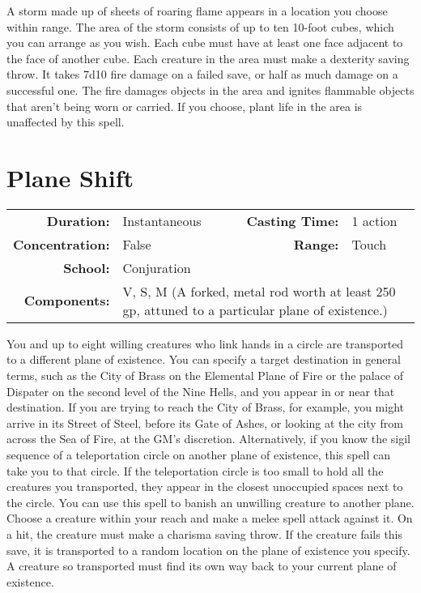 \documentclass[a5paper, 12pt]{memoir}
\begin{document}
\vspace{1\baselineskip}\noindent A storm made up of sheets of roaring flame appears in a location you choose within range. The area of the storm consists of up to ten 10-foot cubes, which you can arrange as you wish. Each cube must have at least one face adjacent to the face of another cube. Each creature in the area must make a dexterity saving throw. It takes 7d10 fire damage on a failed save, or half as much damage on a successful one. The fire damages objects in the area and ignites flammable objects that aren't being worn or carried. If you choose, plant life in the area is unaffected by this spell.

\newpage
\section*{Plane Shift}

{
\small\centering\vspace{-6pt}
\begin{tabular}{rlrl}
\toprule

\textbf{Duration:} & Instantaneous &
\textbf{Casting Time:} & 1 action \\
\textbf{Concentration:} & False &
\textbf{Range:} & Touch \\
\textbf{School:} & Conjuration \\
\textbf{Components:} & \multicolumn{3}{p{0.7\textwidth}}{V, S, M (A forked, metal rod worth at least 250 gp, attuned to a particular plane of existence.)}\\

\bottomrule
\end{tabular}
}

\vspace{1\baselineskip}\noindent You and up to eight willing creatures who link hands in a circle are transported to a different plane of existence. You can specify a target destination in general terms, such as the City of Brass on the Elemental Plane of Fire or the palace of Dispater on the second level of the Nine Hells, and you appear in or near that destination. If you are trying to reach the City of Brass, for example, you might arrive in its Street of Steel, before its Gate of Ashes, or looking at the city from across the Sea of Fire, at the GM's discretion. Alternatively, if you know the sigil sequence of a teleportation circle on another plane of existence, this spell can take you to that circle. If the teleportation circle is too small to hold all the creatures you transported, they appear in the closest unoccupied spaces next to the circle. You can use this spell to banish an unwilling creature to another plane. Choose a creature within your reach and make a melee spell attack against it. On a hit, the creature must make a charisma saving throw. If the creature fails this save, it is transported to a random location on the plane of existence you specify. A creature so transported must find its own way back to your current plane of existence.
\end{document}
